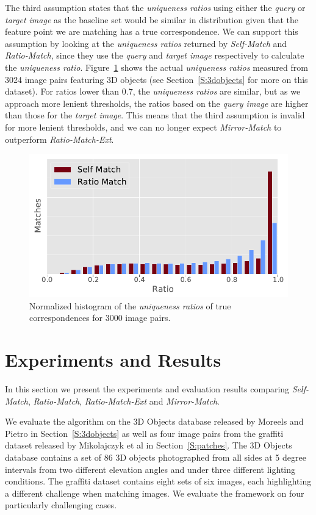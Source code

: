 \documentclass[review]{elsarticle}
\begin{document}
The third assumption states that the \emph{uniqueness ratios} using either the \emph{query} or \emph{target image} as the baseline set would be similar in distribution given that the feature point we are matching has a true correspondence. We can support this assumption by looking at the \emph{uniqueness ratios} returned by \emph{Self-Match} and \emph{Ratio-Match}, since they use the \emph{query} and \emph{target image} respectively to calculate the \emph{uniqueness ratio}. Figure~\ref{fig:ratio_hist} shows the actual \emph{uniqueness ratios} measured from 3024 image pairs featuring 3D objects (see Section~\ref{S:3dobjects} for more on this dataset).  For ratios lower than $0.7$, the \emph{uniqueness ratios} are similar, but as we approach more lenient thresholds, the ratios based on the \emph{query image} are higher than those for the \emph{target image}. This means that the third assumption is invalid for more lenient thresholds, and we can no longer expect \emph{Mirror-Match} to outperform \emph{Ratio-Match-Ext}.


\begin{figure}[htb]
\centering
\includegraphics[width=0.7\columnwidth]{images/results_ratio_hist}
\caption{Normalized histogram of the \emph{uniqueness ratios} of true 
correspondences for 3000 image pairs.}
\label{fig:ratio_hist}
\end{figure}


\section{Experiments and Results}
\label{S:Experiments}
%
In this section we present the experiments and evaluation results comparing \emph{Self-Match}, \emph{Ratio-Match}, \emph{Ratio-Match-Ext} and \emph{Mirror-Match}. 

We evaluate the algorithm on the 3D Objects database released by Moreels and Pietro \cite{moreels2007evaluation} in Section~\ref{S:3dobjects} as well as four image pairs from the graffiti dataset released by Mikolajczyk et al \cite{mikolajczyk2005performance} in Section~\ref{S:patches}. The 3D Objects database contains a set of 86 3D objects photographed from all sides at 5 degree intervals from two different elevation angles and under three different lighting conditions. The graffiti dataset contains eight sets of six images, each highlighting a different challenge when matching images. We evaluate the framework on four particularly challenging cases. 
\end{document}
